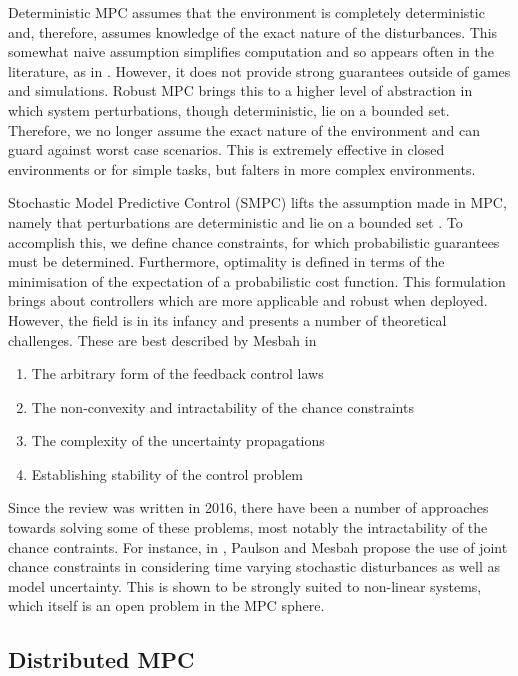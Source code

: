 \documentclass[../sample.tex]{subfiles}
\begin{document}
Deterministic MPC assumes that the environment is completely deterministic and, therefore, assumes
knowledge of the exact nature of the disturbances. This somewhat naive assumption simplifies
computation and so appears often in the literature, as in \cite{Rosolia2018}. However, it does not
provide strong guarantees outside of games and simulations. Robust MPC brings this to a higher level
of abstraction in which system perturbations, though deterministic, lie on a bounded set. Therefore,
we no longer assume the exact nature of the environment and can guard against worst case scenarios.
This is extremely effective in closed environments or for simple tasks, but falters in more complex
environments.

Stochastic Model Predictive Control (SMPC) lifts the assumption made in MPC, namely that
perturbations are deterministic and lie on a bounded set \cite{Mesbah2016}. To accomplish this, we
define chance constraints, for which probabilistic guarantees must be determined. Furthermore,
optimality is defined in terms of the minimisation of the expectation of a probabilistic
cost function. This formulation brings about controllers which are more applicable and robust when
deployed. However, the field is in its infancy and presents a number of theoretical challenges.
These are best described by Mesbah in \cite{Mesbah2016}

\begin{enumerate}
	\item The arbitrary form of the feedback control laws
	\item The non-convexity and intractability of the chance constraints
	\item The complexity of the uncertainty propagations
	\item Establishing stability of the control problem
\end{enumerate}

Since the review \cite{Mesbah2016} was written in 2016, there have been a number of approaches
towards solving some of these problems, most notably the intractability of the chance contraints.
For instance, in  \cite{Paulson2019}, Paulson and Mesbah propose the use of joint chance constraints
in considering time varying stochastic disturbances as well as model uncertainty. This is shown to
be strongly suited to non-linear systems, which itself is an open problem in the MPC sphere.

\subsection{Distributed MPC}
\end{document}
